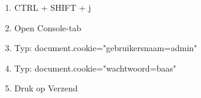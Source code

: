 \begin{enumerate}
  \item CTRL + SHIFT + j
  \item Open Console-tab
  \item Typ: document.cookie="gebruikersnaam=admin"
  \item Typ: document.cookie="wachtwoord=baas"
  \item Druk op Verzend
\end{enumerate}